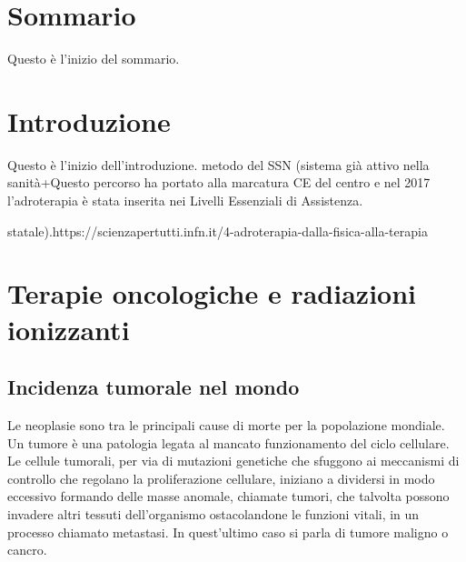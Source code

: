 \documentclass[12pt,a4paper,twoside]{report}
\begin{document}
	\chapter*{Sommario}
		Questo è l'inizio del sommario.
	\newpage
	\tableofcontents
	\newpage
	\chapter*{Introduzione}
		Questo è l'inizio dell'introduzione. metodo del SSN (sistema già attivo nella sanità+Questo percorso ha portato alla marcatura CE del centro e nel 2017 l'adroterapia è stata inserita nei Livelli Essenziali di Assistenza.
		
		 statale).https://scienzapertutti.infn.it/4-adroterapia-dalla-fisica-alla-terapia
	\newpage
	
	\chapter{Terapie oncologiche e radiazioni ionizzanti}
	\section{Incidenza tumorale nel mondo}
	Le neoplasie sono tra le principali cause di morte per la popolazione mondiale. Un tumore è una patologia legata al mancato funzionamento del ciclo cellulare. Le cellule tumorali, per via di mutazioni genetiche che sfuggono ai meccanismi di controllo che regolano la proliferazione cellulare, iniziano a dividersi in modo eccessivo formando delle masse anomale, chiamate tumori, che talvolta possono invadere altri tessuti dell'organismo ostacolandone le funzioni vitali, in un processo chiamato metastasi. In quest'ultimo caso si parla di tumore maligno o cancro.
		
\end{document}
